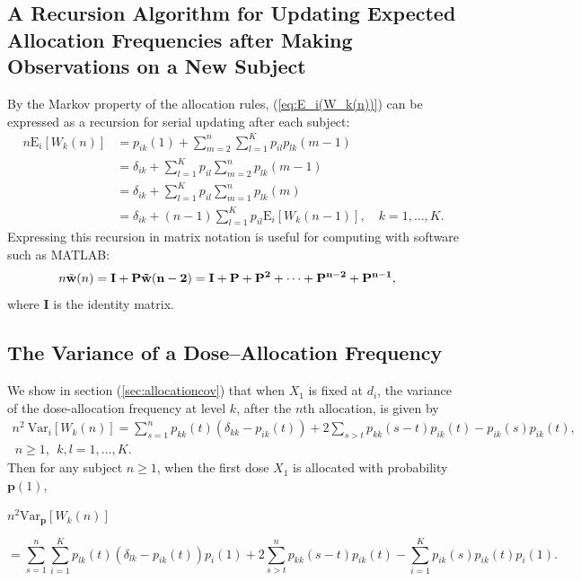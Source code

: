 \subsection{A Recursion Algorithm for Updating Expected Allocation Frequencies after Making Observations on a New Subject}
By the Markov property of the allocation rules,
(\ref{eq:E_i(W_k(n))}) can be expressed as a recursion for serial
updating after each subject:
\begin{align*}
n\mathrm{E}_i\left[W_k(n)\right]&=p_{ik}(1)+\sum_{m=2}^n\sum_{l=1}^Kp_{il}p_{lk}(m-1)\\
&=\delta_{ik}+\sum_{l=1}^Kp_{il}\sum_{m=2}^np_{lk}(m-1)\\
&=\delta_{ik}+\sum_{l=1}^Kp_{il}\sum_{m=1}^np_{lk}(m)\\
&=\delta_{ik}+(n-1)\sum_{l=1}^Kp_{il}\mathrm{E}_i\left[W_{k}(n-1)\right],
\quad k=1,\ldots,K.
\end{align*}
Expressing this recursion in matrix notation is useful for
computing with software such as MATLAB:
\begin{align*}
n\tilde{\mathbf{w}}(n)&=\bf{I}+\mathbf{P}\tilde{\mathbf{w}}(n-2)
=\bf{I}+\mathbf{P}+\mathbf{P}^2+\cdots
+\mathbf{P}^{n-2}+\mathbf{P}^{n-1},
\end{align*}
where $\mathbf{I}$ is the identity matrix.

\subsection{The Variance of a Dose--Allocation Frequency}\label{sec:allocationvariances}
We show in section (\ref{sec:allocationcov}) that  when $X_1$ is
fixed at $d_i$, the variance of the dose-allocation frequency at level $k$, after the $n$th allocation,   is given by
\begin{align*}
n^2\ \textrm{Var}_i\left[W_k(n)\right]
=\sum_{s=1}^np_{kk}(t)\left(\delta_{kk}-p_{ik}(t)\right)
+
2\sum_{s>t} p_{kk}(s-t)p_{ik}(t)-p_{ik}(s)p_{ik}(t),\\
%
\ n\ge 1,\ \ k,l=1,\ldots,K.
\end{align*}
Then for any subject $n\ge 1$, when the first dose $X_1$ is allocated with
probability $\mathbf{p}(1)$,
\begin{flushleft}
$n^2\textrm{Var}_{\mathbf{p}}\left[W_k(n)\right]$
\end{flushleft}
\begin{equation*}
=\sum_{s=1}^n \displaystyle\sum_{i=1}^Kp_{lk}(t)\left(\delta_{lk}-p_{ik}(t)\right)p_i(1)
+2\sum_{s>t}^n p_{kk}(s-t)p_{ik}(t)-\displaystyle\sum_{i=1}^Kp_{ik}(s)p_{ik}(t)p_i(1).
\end{equation*}

